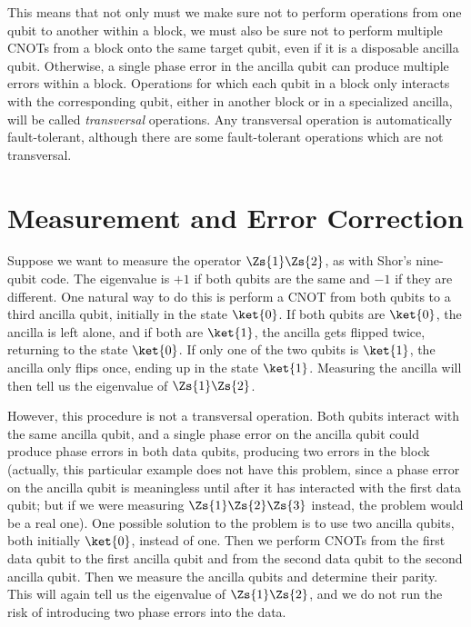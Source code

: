 This means that not only must we make sure not to perform operations
from one qubit to another within a block, we must also be sure not to
perform multiple CNOTs from a block onto the same target qubit, even if it
is a disposable ancilla qubit.  Otherwise, a single phase error in the ancilla
qubit can produce multiple errors within a block.  Operations for which each
qubit in a block only interacts with the corresponding qubit, either in another
block or in a specialized ancilla, will be called {\em transversal} operations.
Any transversal operation is automatically fault-tolerant, although there are
some fault-tolerant operations which are not transversal.

\section{Measurement and Error Correction}
\label{sec-error-cor}

Suppose we want to measure the operator $\Zs{1} \Zs{2}$, as with Shor's
nine-qubit code.  The eigenvalue is $+1$ if both qubits are the same and $-1$
if they are different.  One natural way to do this is perform a CNOT from
both qubits to a third ancilla qubit, initially in the state $\ket{0}$.  If
both qubits are $\ket{0}$, the ancilla is left alone, and if both are
$\ket{1}$, the ancilla gets flipped twice, returning to the state $\ket{0}$.
If only one of the two qubits is $\ket{1}$, the ancilla only flips once, ending
up in the state $\ket{1}$.  Measuring the ancilla will then tell us the
eigenvalue of $\Zs{1} \Zs{2}$.

However, this procedure is not a transversal operation.  Both qubits
interact with the same ancilla qubit, and a single phase error on the ancilla
qubit could produce phase errors in both data qubits, producing two errors
in the block (actually, this particular example does not have this problem,
since a phase error on the ancilla qubit is meaningless until after it has
interacted with the first data qubit; but if we were measuring $\Zs{1} \Zs{2}
\Zs{3}$ instead, the problem would be a real one).  One possible solution to
the problem is to use two ancilla qubits, both initially $\ket{0}$, instead of
one.  Then we perform CNOTs from the first data qubit to the first ancilla
qubit and from the second data qubit to the second ancilla qubit.  Then we
measure the ancilla qubits and determine their parity.  This will again tell
us the eigenvalue of $\Zs{1} \Zs{2}$, and we do not run the risk of introducing
two phase errors into the data.

